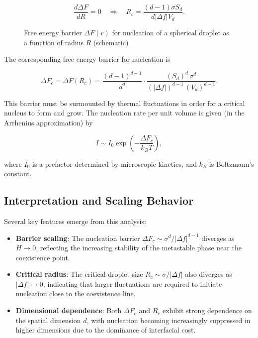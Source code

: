 \documentclass[
  letterpaper,
  enabledeprecatedfontcommands]{report}
\providecommand{\tightlist}{%
  \setlength{\itemsep}{0pt}\setlength{\parskip}{0pt}}
\begin{document}
\[
\frac{d \Delta F}{dR} = 0 \quad \Rightarrow \quad R_c = \frac{(d-1)\sigma S_d}{d |\Delta f| V_d}.
\]

\begin{figure}


\caption{\label{fig-cnt-schem}Free energy barrier \(\Delta F(r)\) for
nucleation of a spherical droplet as a function of radius \(R\)
(schematic)}

\end{figure}%

The corresponding free energy barrier for nucleation is

\[
\Delta F_c = \Delta F(R_c) = \frac{(d-1)^{d-1}}{d^d} \cdot \frac{(S_d)^d \, \sigma^d}{(|\Delta f|)^{d-1} \, (V_d)^{d-1}}.
\]

This barrier must be surmounted by thermal fluctuations in order for a
critical nucleus to form and grow. The nucleation rate per unit volume
is given (in the Arrhenius approximation) by

\[
I \sim I_0 \exp\left( -\frac{\Delta F_c}{k_B T} \right),
\]

where \(I_0\) is a prefactor determined by microscopic kinetics, and
\(k_B\) is Boltzmann's constant.

\subsection{Interpretation and Scaling
Behavior}\label{interpretation-and-scaling-behavior}

Several key features emerge from this analysis:

\begin{itemize}
\tightlist
\item
  \textbf{Barrier scaling}: The nucleation barrier
  \(\Delta F_c \sim \sigma^d / |\Delta f|^{d-1}\) diverges as
  \(H \to 0\), reflecting the increasing stability of the metastable
  phase near the coexistence point.
\item
  \textbf{Critical radius}: The critical droplet size
  \(R_c \sim \sigma / |\Delta f|\) also diverges as
  \(|\Delta f| \to 0\), indicating that larger fluctuations are required
  to initiate nucleation close to the coexistence line.
\item
  \textbf{Dimensional dependence}: Both \(\Delta F_c\) and \(R_c\)
  exhibit strong dependence on the spatial dimension \(d\), with
  nucleation becoming increasingly suppressed in higher dimensions due
  to the dominance of interfacial cost.
\end{itemize}
\end{document}
